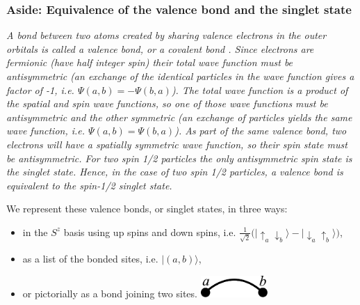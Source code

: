 \subsubsection{Aside: Equivalence of the valence bond and the singlet state}
{\it{A bond between two atoms created by sharing valence electrons in the outer orbitals is called a valence bond, or a covalent bond \cite{Slater1931,Pauling1933}.
Since electrons are fermionic (have half integer spin) their total
wave function must be antisymmetric (an exchange of the identical particles in the wave function
gives a factor of -1, i.e. $\Psi(a,b) = -\Psi(b,a)$).
The total wave function is a product of the spatial and spin wave functions, so one of those wave functions must be antisymmetric and the other symmetric (an exchange of particles yields the same wave function, i.e. $\Psi(a,b) = \Psi(b,a)$).
As part of the same valence bond, two electrons will have a spatially symmetric wave function, so their spin state must be antisymmetric.  For two spin 1/2 particles the only antisymmetric spin state is the singlet state.  
Hence, in the case of two spin 1/2 particles, a valence bond is equivalent to the spin-1/2 singlet state.}}

We represent these valence bonds, or singlet states, in three ways: 
\begin{itemize}
\item{in the $S^z$ basis using up spins and down spins, 
i.e. $\tfrac{1}{\sqrt{2}}\big(\lvert \uparrow_a \downarrow_b \rangle - \lvert \downarrow_a \uparrow_b \rangle\big)$,}
\item{ as a list of the bonded sites, i.e. $\lvert(a,b)\rangle$,}
\vspace{-3mm}
\item{
or pictorially as a bond joining two sites.\; \includegraphics[width=1in]{./figures/made/bond2.pdf}}
\end{itemize}

